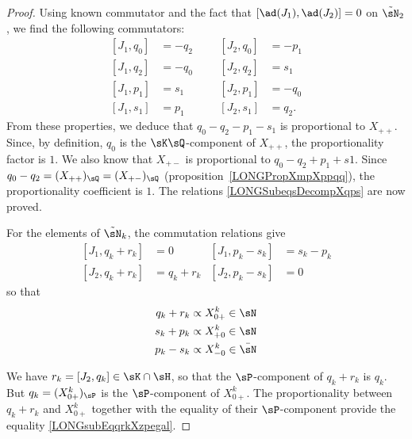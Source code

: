 \begin{proof}


	Using known commutator and the fact that $[\ad(J_1),\ad(J_2)]=0$ on $\tilde\sN_2$, we find the following commutators:
	\begin{subequations}
		\begin{align}
			[J_1,q_0] & =-q_2 &  &  & [J_2,q_0] & =-p_1			\label{LONGsubEqJunqzJdeuxqzmoinspun} \\
			[J_1,q_2] & =-q_0 &  &  & [J_2,q_2] & =s_1\label{LONGsubEqJunqzJdeuxqzmoinspdeux}   \\
			[J_1,p_1] & =s_1  &  &  & [J_2,p_1] & =-q_0                                         \\
			[J_1,s_1] & =p_1  &  &  & [J_2,s_1] & =q_2.
		\end{align}
	\end{subequations}
	From these properties, we deduce that $q_0-q_2-p_1-s_1$ is proportional to $X_{++}$. Since, by definition, $q_0$ is the $\sK\sQ$-component of $X_{++}$, the proportionality factor is $1$. We also know that  $X_{+-}$ is proportional to $q_0-q_2+p_1+s1$. Since $q_0-q_2=(X_{++})_{\sQ}=(X_{+-})_{\sQ}$ (proposition~\ref{LONGPropXmpXppqq}), the proportionality coefficient is $1$. The relations \eqref{LONGSubeqsDecompXqps} are now proved.

	For the elements of $\tilde\sN_k$, the commutation relations give
	\begin{subequations}
		\begin{align}
			[J_1,q_k+r_k] & =0       & [J_1,p_k-s_k] & =s_k-p_k \\
			[J_2,q_k+r_k] & =q_k+r_k & [J_2,p_k-s_k] & =0
		\end{align}
	\end{subequations}
	so that
	\begin{equation}
		\begin{aligned}[]
			q_k+r_k & \propto X_{0+}^k\in\sN     \\
			s_k+p_k & \propto X^k_{+0}\in\sN     \\
			p_k-s_k & \propto X^k_{-0}\in\bar\sN
		\end{aligned}
	\end{equation}

	We have $r_k=[J_2,q_k]\in\sK\cap\sH$, so that the $\sP$-component of $q_k+r_k$ is $q_k$. But $q_k=(X_{0+}^k)_{\sP}$ is the $\sP$-component of $X_{0+}^k$. The proportionality between $q_k+r_k$ and $X_{0+}^k$ together with the equality of their $\sP$-component provide the equality \eqref{LONGsubEqqrkXzpegal}.


\end{proof}
